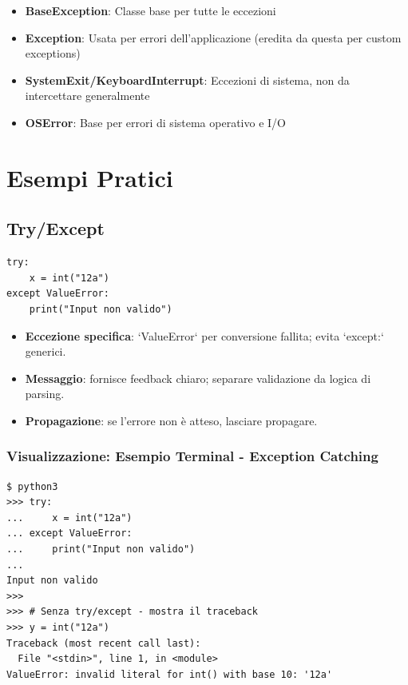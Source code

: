 \vspace{0.5cm}
\begin{tcolorbox}[title=Note sulla Gerarchia]
\begin{itemize}
  \item \textbf{BaseException}: Classe base per tutte le eccezioni
  \item \textbf{Exception}: Usata per errori dell'applicazione (eredita da questa per custom exceptions)
  \item \textbf{SystemExit/KeyboardInterrupt}: Eccezioni di sistema, non da intercettare generalmente
  \item \textbf{OSError}: Base per errori di sistema operativo e I/O
\end{itemize}
\end{tcolorbox}

\section{Esempi Pratici}
\subsection{Try/Except}
\begin{lstlisting}
try:
    x = int("12a")
except ValueError:
    print("Input non valido")
\end{lstlisting}
\begin{tcolorbox}[title=Spiegazione del codice]
\begin{itemize}
  \item \textbf{Eccezione specifica}: `ValueError` per conversione fallita; evita `except:` generici.
  \item \textbf{Messaggio}: fornisce feedback chiaro; separare validazione da logica di parsing.
  \item \textbf{Propagazione}: se l'errore non è atteso, lasciare propagare.
\end{itemize}
\end{tcolorbox}

\subsubsection{Visualizzazione: Esempio Terminal - Exception Catching}
\begin{tcolorbox}[colback=black!5, colframe=black!70, title=Output Terminal, fonttitle=\bfseries\color{white}, coltitle=black]
\begin{lstlisting}[style=python]
$ python3
>>> try:
...     x = int("12a")
... except ValueError:
...     print("Input non valido")
...
Input non valido
>>>
>>> # Senza try/except - mostra il traceback
>>> y = int("12a")
Traceback (most recent call last):
  File "<stdin>", line 1, in <module>
ValueError: invalid literal for int() with base 10: '12a'
\end{lstlisting}
\end{tcolorbox}

